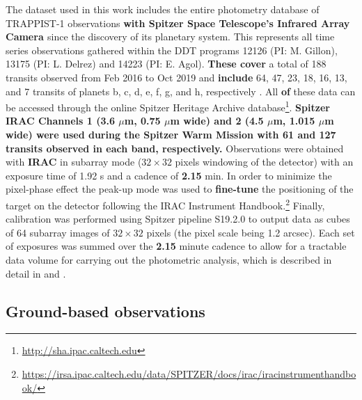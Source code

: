 \documentclass[twocolumn]{aastex63}
\begin{document}
The dataset used in this work includes the entire photometry database of TRAPPIST-1 observations \textbf{with Spitzer Space \textbf{Telescope}'s Infrared Array Camera \citep[IRAC;][] {Carey2004}} since the discovery of its planetary system. This represents all time series observations gathered within the DDT programs 12126 (PI: M. Gillon), 13175 (PI: L. Delrez) and 14223 (PI: E. Agol). \textbf{These cover} a total of 188 transits observed from Feb 2016 to Oct 2019 and \textbf{include} 64, 47, 23, 18, 16, 13, and 7 transits of planets b, c, d, e, f, g, and h, respectively \citep{Ducrot2020}. All \textbf{of} these data can be accessed through the online Spitzer Heritage Archive database\footnote{\url{http://sha.ipac.caltech.edu}}.  \textbf{Spitzer IRAC Channels 1 (3.6 $\mu$m, 0.75 $\mu$m wide) and
2 (4.5 $\mu$m, 1.015 $\mu$m wide) were used during the Spitzer Warm Mission \textbf{\citep{Fazio2004,StorrieLombardi2010}} with 61 and 127 transits observed in each band, respectively.}
Observations were obtained with \textbf{IRAC} in subarray mode ($32{\times}32$ pixels windowing of the detector) with an exposure time of 1.92 s and a cadence of \textbf{2.15} min. In order to minimize the pixel-phase effect \citep{Knutson2008} the peak-up mode was used \citep{Ingalls2016} to \textbf{fine-tune} the positioning of the target on the detector following the IRAC Instrument Handbook.\footnote{\url{https://irsa.ipac.caltech.edu/data/SPITZER/docs/irac/iracinstrumenthandbook/}} Finally, calibration was performed using Spitzer pipeline S19.2.0 to output data as cubes of 64 subarray images of $32{\times}32$ pixels (the pixel scale being 1.2 arcsec). Each set of exposures was summed over the \textbf{2.15} minute cadence to allow for a tractable data volume for carrying out the photometric analysis, which is described in detail in \citet{Delrez2018a} and \citet{Ducrot2020}.

\subsection{Ground-based observations} \label{sec:groundbasedobs}


\end{document}
